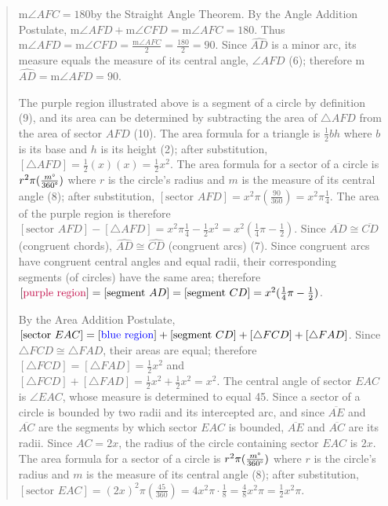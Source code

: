 \documentclass[letterpaper,12pt,twoside]{report}
\begin{document}
\begin{quotation}
$\text{m}\angle AFC=180$\textdegree \space by the Straight Angle Theorem. By the Angle Addition Postulate, $\text{m}\angle AFD+\text{m}\angle CFD=\text{m}\angle AFC=180$\textdegree. Thus $\text{m}\angle AFD=\text{m}\angle CFD=\frac{\text{m}\angle AFC}{2}=\frac{180}{2}=90$\textdegree. Since $\widehat{AD}$ is a minor arc, its measure equals the measure of its central angle, $\angle AFD$ (6); therefore m$\widehat{AD}=\text{m}\angle AFD=90$\textdegree.
		
		The {\color{purple} purple} region illustrated above is a segment of a circle by definition (9), and its area can be determined by subtracting the area of $\triangle AFD$ from the area of sector $AFD$ (10). The area formula for a triangle is $\frac{1}{2}bh$ where $b$ is its base and $h$ is its height (2); after substitution, $[\triangle AFD]=\frac{1}{2}(x)(x)=\frac{1}{2}x^2$. The area formula for a sector of a circle is $r^2\pi(\frac{m\text{\textdegree}}{360\text{\textdegree}})$ where $r$ is the circle's radius and $m$ is the measure of its central angle (8); after substitution, $[\text{sector  } AFD]=x^2\pi (\frac{90}{360})=x^2\pi\frac{1}{4}$. The area of the {\color{purple} purple} region is therefore $[\text{sector  } AFD]-[\triangle AFD]=x^2\pi\frac{1}{4}-\frac{1}{2}x^2=x^2(\frac{1}{4}\pi-\frac{1}{2})$. Since $\overline{AD}\cong\overline{CD}$ (congruent chords), $\widehat{AD}\cong\widehat{CD}$ (congruent arcs) (7). Since congruent arcs have congruent central angles and equal radii, their corresponding segments (of circles) have the same area; therefore $[\text{\color{purple} purple region}]=[\text{segment  } AD]=[\text{segment  } CD]=x^2(\frac{1}{4}\pi-\frac{1}{2})$.
		
		By the Area Addition Postulate, $[\text{sector  } EAC]=[\text{\color{blue} blue region}]+[\text{segment  } CD]+[\triangle FCD]+[\triangle FAD]$. Since $\triangle FCD\cong\triangle FAD$, their areas are equal; therefore $[\triangle FCD]=[\triangle FAD]=\frac{1}{2}x^2$ and $[\triangle FCD]+[\triangle FAD]=\frac{1}{2}x^2+\frac{1}{2}x^2=x^2$. The central angle of sector $EAC$ is $\angle EAC$, whose measure is determined to equal 45\textdegree. Since a sector of a circle is bounded by two radii and its intercepted arc, and since $\overline{AE}$ and $\overline{AC}$ are the segments by which sector $EAC$ is bounded, $\overline{AE}$ and $\overline{AC}$ are its radii. Since $AC=2x$, the radius of the circle containing sector $EAC$ is $2x$. The area formula for a sector of a circle is $r^2\pi(\frac{m\text{\textdegree}}{360\text{\textdegree}})$ where $r$ is the circle's radius and $m$ is the measure of its central angle (8); after substitution, $[\text{sector  } EAC]=(2x)^2\pi(\frac{45}{360})=4x^2\pi\cdot\frac{1}{8}=\frac{4}{8}x^2\pi=\frac{1}{2}x^2\pi$.
		

\end{quotation}
\end{document}
